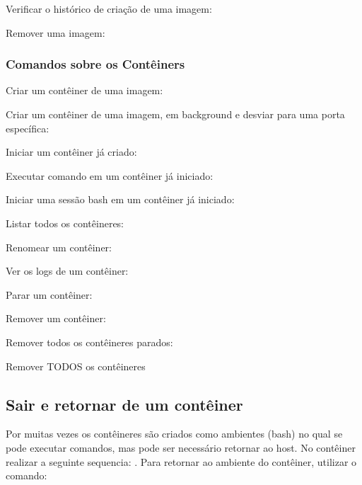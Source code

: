 \documentclass[a4paper,11pt]{article}
\begin{document}
Verificar o histórico de criação de uma imagem: \\

Remover uma imagem: \\

\subsubsection{Comandos sobre os Contêiners}
Criar um contêiner de uma imagem: \\

Criar um contêiner de uma imagem, em background e desviar para uma porta específica: \\

Iniciar um contêiner já criado: \\

Executar comando em um contêiner já iniciado: \\

Iniciar uma sessão bash em um contêiner já iniciado: \\

Listar todos os contêineres: \\

Renomear um contêiner: \\

Ver os logs de um contêiner: \\

Parar um contêiner: \\

Remover um contêiner: \\

Remover todos os contêineres parados: \\

Remover TODOS os contêineres \\

\subsection{Sair e retornar de um contêiner}
Por muitas vezes os contêineres são criados como ambientes (bash) no qual se pode executar comandos, mas pode ser necessário retornar ao host. No contêiner realizar a seguinte sequencia: . Para retornar ao ambiente do contêiner, utilizar o comando: \\
\end{document}
